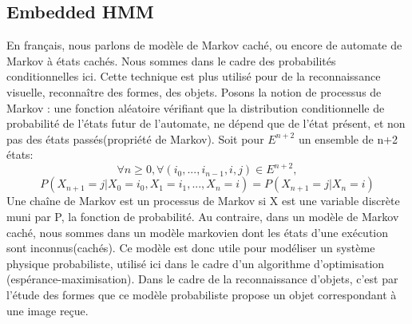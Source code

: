 \documentclass[12pt,french]{article}
\theoremstyle{plain}
\theoremstyle{definition}
\begin{document}
\subsection{Embedded HMM}
En français, nous parlons de modèle de Markov caché, ou encore de automate de Markov à états cachés. Nous sommes dans le cadre des probabilités conditionnelles ici. Cette technique est plus utilisé pour de la reconnaissance visuelle, reconnaître des formes, des objets.
Posons la notion de processus de Markov : une fonction aléatoire vérifiant que la distribution conditionnelle de probabilité de l'états futur de l'automate, ne dépend que de l'état présent, et non pas des états passés(propriété de Markov). Soit pour $E^{n+2}$ un ensemble de n+2 états:
\[
  \forall n\geq0, \forall(i_0,..., i_{n-1}, i, j)\in E^{n+2},
\]
\[
  P(X_{n+1}=j | X_0=i_0, X_1=i_1, ..., X_n=i) = P(X_{n+1}=j | X_n=i)
\]
Une chaîne de Markov est un processus de Markov si X est une variable discrète muni par P, la fonction de probabilité.
Au contraire, dans un modèle de Markov caché, nous sommes dans un modèle markovien dont les états d'une exécution sont inconnus(cachés).
Ce modèle est donc utile pour modéliser un système physique probabiliste, utilisé ici dans le cadre d'un algorithme d'optimisation (espérance-maximisation).
Dans le cadre de la reconnaissance d'objets, c'est par l'étude des formes que ce modèle probabiliste propose un objet correspondant à une image reçue.
\end{document}
